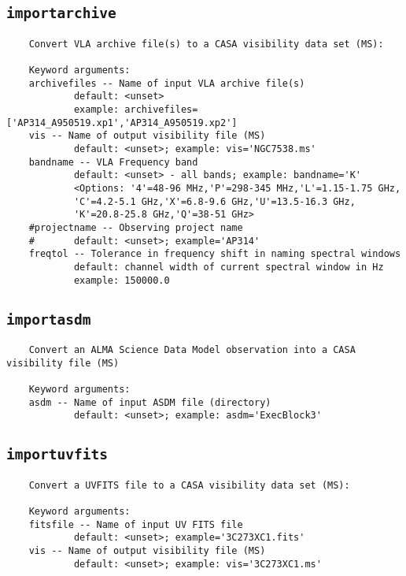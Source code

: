 \subsection{{\tt importarchive}}
\label{section:tasks.importarchive}

\small
\begin{verbatim}
    Convert VLA archive file(s) to a CASA visibility data set (MS):
    
    Keyword arguments:
    archivefiles -- Name of input VLA archive file(s)
            default: <unset>
            example: archivefiles=['AP314_A950519.xp1','AP314_A950519.xp2']
    vis -- Name of output visibility file (MS)
            default: <unset>; example: vis='NGC7538.ms'
    bandname -- VLA Frequency band
            default: <unset> - all bands; example: bandname='K'
            <Options: '4'=48-96 MHz,'P'=298-345 MHz,'L'=1.15-1.75 GHz,
            'C'=4.2-5.1 GHz,'X'=6.8-9.6 GHz,'U'=13.5-16.3 GHz,
            'K'=20.8-25.8 GHz,'Q'=38-51 GHz>
    #projectname -- Observing project name
    #       default: <unset>; example='AP314'
    freqtol -- Tolerance in frequency shift in naming spectral windows
            default: channel width of current spectral window in Hz
            example: 150000.0

\end{verbatim}
\normalsize


\subsection{{\tt importasdm}}
\label{section:tasks.importasdm}

\small
\begin{verbatim}
    Convert an ALMA Science Data Model observation into a CASA visibility file (MS)
    
    Keyword arguments:
    asdm -- Name of input ASDM file (directory)
            default: <unset>; example: asdm='ExecBlock3'
\end{verbatim}
\normalsize


\subsection{{\tt importuvfits}}
\label{section:tasks.importuvfits}

\small
\begin{verbatim}
    Convert a UVFITS file to a CASA visibility data set (MS):
    
    Keyword arguments:
    fitsfile -- Name of input UV FITS file
            default: <unset>; example='3C273XC1.fits'
    vis -- Name of output visibility file (MS)
            default: <unset>; example: vis='3C273XC1.ms'
\end{verbatim}
\normalsize


